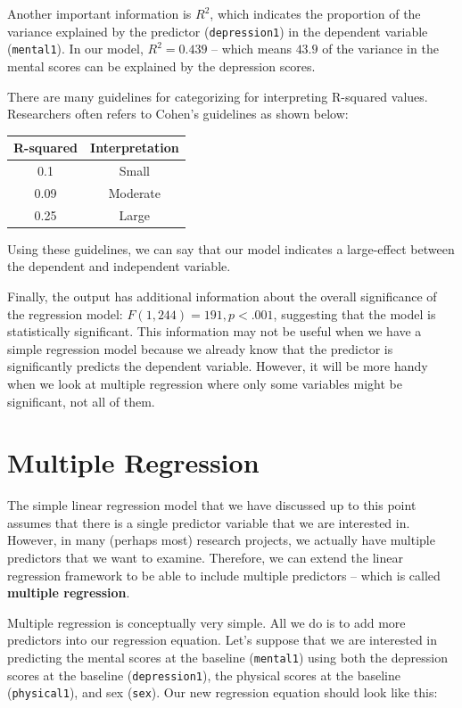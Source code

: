 \documentclass[]{book}
\begin{document}
Another important information is \(R^2\), which indicates the proportion of the variance explained by the predictor (\texttt{depression1}) in the dependent variable (\texttt{mental1}). In our model, \(R^2 = 0.439\) -- which means \(43.9%
\) of the variance in the mental scores can be explained by the depression scores.

There are many guidelines for categorizing for interpreting R-squared values. Researchers often refers to Cohen's guidelines as shown below:

\begin{longtable}[]{@{}cc@{}}
\toprule
R-squared & Interpretation\tabularnewline
\midrule
\endhead
0.1 & Small\tabularnewline
0.09 & Moderate\tabularnewline
0.25 & Large\tabularnewline
\bottomrule
\end{longtable}

Using these guidelines, we can say that our model indicates a large-effect between the dependent and independent variable.

Finally, the output has additional information about the overall significance of the regression model: \(F(1, 244) = 191, p < .001\), suggesting that the model is statistically significant. This information may not be useful when we have a simple regression model because we already know that the predictor is significantly predicts the dependent variable. However, it will be more handy when we look at multiple regression where only some variables might be significant, not all of them.

\hypertarget{multiple-regression}{%
\section{Multiple Regression}\label{multiple-regression}}

The simple linear regression model that we have discussed up to this point assumes that there is a single predictor variable that we are interested in. However, in many (perhaps most) research projects, we actually have multiple predictors that we want to examine. Therefore, we can extend the linear regression framework to be able to include multiple predictors -- which is called \textbf{multiple regression}.

Multiple regression is conceptually very simple. All we do is to add more predictors into our regression equation. Let's suppose that we are interested in predicting the mental scores at the baseline (\texttt{mental1}) using both the depression scores at the baseline (\texttt{depression1}), the physical scores at the baseline (\texttt{physical1}), and sex (\texttt{sex}). Our new regression equation should look like this:
\end{document}
